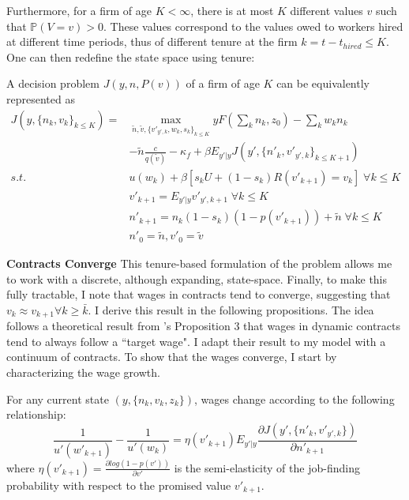 Furthermore, for a firm of age $K<\infty$, there is at most $K$ different values $v$ such that $\mathbb{P}(V=v)>0$. These values correspond to the values owed to workers hired at different time periods, thus of different tenure at the firm $k=t-t_{hired}\leq K$.  One can then redefine the state space using tenure: 
\begin{lemma} \label{lemma_tenure}
A decision problem $J(y,n,P(v))$ of a firm of age $K$ can be equivalently represented as
\begin{equation*}
    \begin{split}
 J(y,\{n_k,v_k\}_{k\leq K}) =
    & \max_{\tilde{n},\tilde{v},\{v'_{y',k},w_{k},s_{k}\}_{k\leq K}} 
    yF(\sum_k n_k,z_0)-
    \sum_k w_kn_k \\
    & -\tilde{n}\frac{c}{q(\tilde{v})}-\kappa_f
    +\beta E_{y'|y} J(y',\{n'_k,v'_{y',k}\}_{k\leq K+1}) \\
     s.t. \: & u(w_k) + \beta [s_k U + (1-s_k)R(v'_{k+1})=v_k] \; \forall k\leq K \\
    & v'_{k+1} = E_{y'|y} v'_{y',k+1} \; \forall k\leq K \\
    & n'_{k+1} = n_k(1-s_k)(1-p(v'_{k+1}))+\tilde{n}\; \forall k\leq K \\
    & n'_0 = \tilde{n}, v'_0 = \tilde{v}
    \end{split}
\end{equation*}
\end{lemma}
\textbf{Contracts Converge}
This tenure-based formulation of the problem allows me to work with a discrete, although expanding, state-space. Finally, to make this fully tractable, I note that wages in contracts tend to converge, suggesting that $v_k\approx v_{k+1} \forall k\geq\bar{k}$. I derive this result in the following propositions. The idea follows a theoretical result from \textcite{balke2022}'s Proposition 3 that wages in dynamic contracts tend to always follow a ``target wage". I adapt their result to my model with a continuum of contracts.
\newline
To show that the wages converge, I start by characterizing the wage growth.
\begin{proposition} \label{prop:wagegrowth}
  For any current state $(y,\{n_k,v_k,z_k\})$, wages change according to the following relationship:
\begin{equation} 
    \frac{1}{u'(w'_{k+1})} - \frac{1}{u'(w_k)} = \eta(v'_{k+1}) E_{y'|y} \frac{\partial J(y',\{n'_k,v'_{y',k}\})}{\partial n'_{k+1}}
\end{equation}
where $\eta(v'_{k+1}) = \frac{\partial log(1-p(v'))}{\partial v'}$ is the semi-elasticity of the job-finding probability with respect to the promised value $v'_{k+1}$.
\end{proposition}

